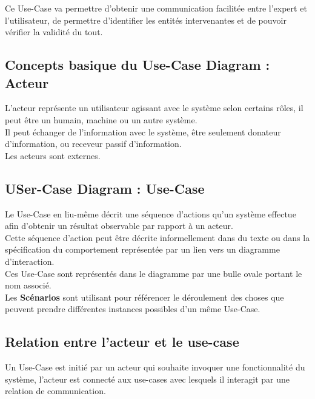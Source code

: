 \documentclass{report}
\begin{document}
		Ce Use-Case va permettre d'obtenir une communication facilitée entre l'expert et l'utilisateur, de permettre d'identifier les entités intervenantes et de pouvoir vérifier la validité du tout.\\

		\subsection{Concepts basique du Use-Case Diagram : Acteur}

			L'acteur représente un utilisateur agissant avec le système selon certains rôles, il peut être un humain, machine ou un autre système.\\
			Il peut échanger de l'information avec le système, être seulement donateur d'information, ou receveur passif d'information.\\
			Les acteurs sont externes.\\

		\subsection{USer-Case Diagram : Use-Case}

			Le Use-Case en liu-même décrit une séquence d'actions qu'un système effectue afin d'obtenir un résultat observable par rapport à un acteur.\\
			Cette séquence d'action peut être décrite informellement dans du texte ou dans la spécification du comportement représentée par un lien vers un diagramme d'interaction.\\

			Ces Use-Case sont représentés dans le diagramme par une bulle ovale portant le nom associé.\\

			Les \textbf{Scénarios} sont utilisant pour référencer le déroulement des choses que peuvent prendre différentes instances possibles d'un même Use-Case.\\

		\subsection{Relation entre l'acteur et le use-case}

			Un Use-Case est initié par un acteur qui souhaite invoquer une fonctionnalité du système, l'acteur est connecté aux use-cases avec lesquels il interagit par une relation de communication.\\
\end{document}
